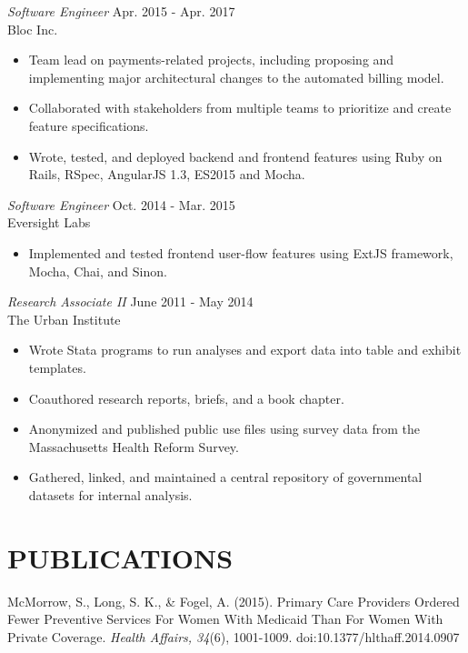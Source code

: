 \documentclass[margin, 10pt]{res} %
\begin{document}
\begin{resume}
{\sl Software Engineer} \hfill Apr. 2015 - Apr. 2017 \\
Bloc Inc.
\begin{itemize} \itemsep -2pt %
\item Team lead on payments-related projects, including proposing and implementing major architectural changes to the automated billing model.
\item Collaborated with stakeholders from multiple teams to prioritize and create feature specifications.
\item Wrote, tested, and deployed backend and frontend features using Ruby on Rails, RSpec, AngularJS 1.3, ES2015 and Mocha.
\end{itemize}

{\sl Software Engineer} \hfill Oct. 2014 - Mar. 2015 \\
Eversight Labs
\begin{itemize} \itemsep -2pt %
\item Implemented and tested frontend user-flow features using ExtJS framework, Mocha, Chai, and Sinon.
\end{itemize}

{\sl  Research Associate II } \hfill June 2011 - May 2014\\
The Urban Institute
\begin{itemize} \itemsep -2pt %
\item Wrote Stata programs to run analyses and export data into table and exhibit templates.
\item Coauthored research reports, briefs, and a book chapter.
\item Anonymized and published public use files using survey data from the Massachusetts Health Reform Survey.
\item Gathered, linked, and maintained a central repository of governmental datasets for internal analysis.
\end{itemize}

\section{\small\bf PUBLICATIONS}
McMorrow, S., Long, S. K., \& Fogel, A. (2015). Primary Care Providers Ordered Fewer Preventive Services For Women With Medicaid Than For Women With Private Coverage. {\sl Health Affairs, 34}(6), 1001-1009. doi:10.1377/hlthaff.2014.0907


\end{resume}
\end{document}
